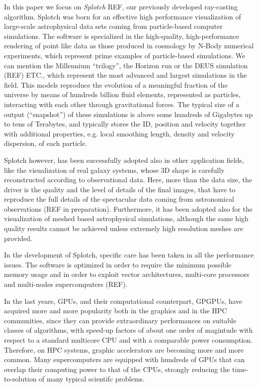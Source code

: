 \documentclass[11pt]{article}
\begin{document}
In this paper we focus on {\it Splotch} REF, our previously developed ray-casting
algorithm. Splotch was born for an effective high performance visualization of large-scale 
astrophysical data sets coming from particle-based computer simulations. The software is 
specialized in the high-quality, high-performance rendering of point like data as those 
produced in cosmology by N-Body numerical experiments, which 
represent prime examples of particle-based simulations. We can mention 
the Millennium ``trilogy'', the Horizon run or the DEUS simulation (REF) ETC., which
represent the most advanced and largest simulations in the field. 
This models reproduce the evolution of a meaningful fraction
of the universe by means of hundreds billion fluid elements, represented as particles,
interacting with each other through gravitational
forces. The typical size of a output (``snapshot'') of these simulations is above some hundreds 
of Gigabytes up to tens of Terabytes, and typically stores the
ID, position and velocity together with additional properties, e.g.
local smoothing length, density and velocity dispersion, of each particle.

Splotch however, has been successfully adopted also in other application fields,
like the visualization of real galaxy systems, whose 3D shape is carefully reconstructed
according to observational data. Here, more than the data size, the driver is
the quality and the level of details of the final images,
that have to reproduce the full details of the
spectacular data coming from astronomical observations (REF in preparation). Furthermore,
it has been adopted also for the visualization of meshed based astrophysical simulations, 
although the same high quality results cannot be achieved unless extremely high resolution
meshes are provided. 

In the development of Splotch, specific care has been taken in all the performance 
issues. The software is optimized in order to require the minimum possible
memory usage and in order to exploit vector architectures, multi-core processors 
and multi-nodes supercomputers (REF). 

In the last years, 
GPUs, and their computational counterpart, GPGPUs, have 
acquired more and more popularity both in the graphics and in the HPC 
communities, since they can provide extraordinary performances on suitable
classes of algorithms, with speed-up factors of about one order of magintude with respect to 
a standard multicore CPU and with a comparable power consumption.
Therefore, on HPC systems, graphic accelerators are becoming more and more common. 
Many supercomputers are equipped with hundreds of GPUs that can overlap 
their computing power to that of the CPUs, strongly reducing the time-to-solution
of many typical scientifc problems.
\end{document}
